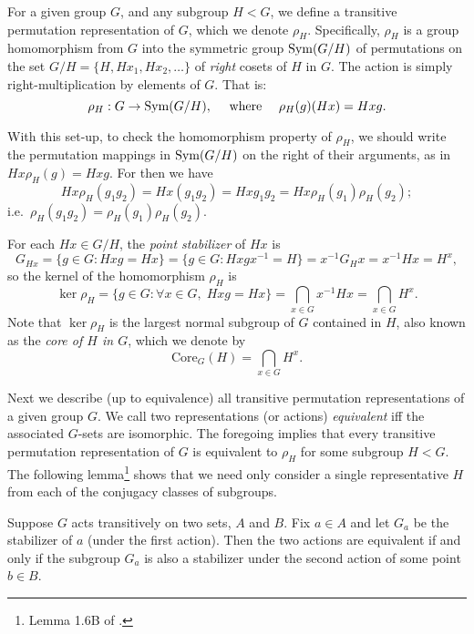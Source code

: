 \newcommand{\Core}{\ensuremath{\mathrm{Core}}}
For a given group $G$, and any subgroup $H< G$,
we define a transitive permutation representation of $G$, which we
denote $\rho_H$.  Specifically, $\rho_H$ is a group homomorphism from $G$ into
the symmetric group $\operatorname{Sym}(G/H)$ of permutations on the set $G/H = \{H, Hx_1,
Hx_2, \dots \}$ of \emph{right} cosets of $H$ in $G$.
The action is simply right-multiplication by elements of $G$. That is:
\[
\rho_H : G \rightarrow \operatorname{Sym}(G/H), \quad \text{ where } \quad 
\rho_H(g)(Hx)= Hxg.
\]

With this set-up, to check the homomorphism property of $\rho_H$, 
we should write the permutation mappings in $\operatorname{Sym}(G/H)$ on the
right of their arguments, as in $Hx \rho_H(g) = Hxg$.  For then we have
\[
Hx \rho_H(g_1 g_2) = Hx (g_1 g_2) = Hx g_1 g_2 = Hx\rho_H(g_1)\rho_H(g_2);
\] 
i.e.~$\rho_H(g_1 g_2) = \rho_H(g_1)\rho_H(g_2)$.

For each $Hx \in G/H$, the \emph{point stabilizer} of $Hx$ is 
\[
G_{Hx} = \{g\in G : Hxg = Hx \} = 
\{g\in G : Hxgx^{-1}  = H \} = 
x^{-1} G_H x  = x^{-1} H x = H^x,
\]
so the kernel of the homomorphism $\rho_H$ is 
\[
\ker \rho_H = \{g\in G : \forall x \in G,\; Hxg = Hx \} = 
\bigcap_{x\in G} x^{-1} H x = \bigcap_{x\in G} H^x.
\]
Note that $\ker \rho_H$ is the largest normal subgroup of $G$ 
contained in $H$, also known as the \emph{core of $H$ in $G$}, which we denote
by 
\[
\Core_G(H) = \bigcap_{x\in G} H^x.
\]

Next we describe (up to equivalence) all transitive permutation
representations of a given group $G$.  
We call two representations (or actions) \emph{equivalent}
iff the associated $G$-sets are isomorphic. 
The foregoing implies that every transitive permutation representation of $G$ is
equivalent to $\rho_H$ for some subgroup $H < G$.  The following
lemma\footnote{Lemma 1.6B of \cite{Dixon:1996}.} 
shows that we need only consider a single representative $H$ from each of the
conjugacy classes of subgroups.  

\begin{lemma}
Suppose $G$ acts transitively on two sets,
$A$ and $B$.  Fix $a\in A$ and let $G_a$ be the stabilizer of $a$ (under the first
action).  Then the two actions are equivalent
if and only if the subgroup $G_a$ is also a stabilizer under the second action
of some point $b\in B$. 
\end{lemma}


